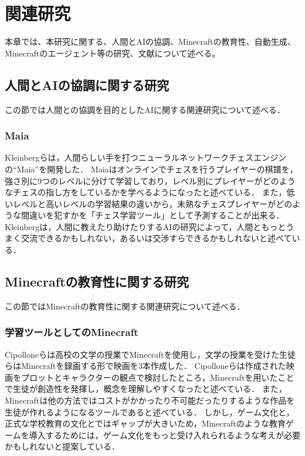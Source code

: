 \chapter{関連研究}	
\thispagestyle{plain}   %

本章では、本研究に関する、人間とAIの協調、Minecraftの教育性、自動生成、Minecraftのエージェント等の研究、文献について述べる。

\section{人間とAIの協調に関する研究}
この節では人間との協調を目的としたAIに関する関連研究について述べる．

\subsection{Maia}
Kleinbergらは，人間らしい手を打つニューラルネットワークチェスエンジンの“Maia”を開発した\cite{bib:maia}．
Maiaはオンラインでチェスを行うプレイヤーの棋譜を，強さ別に9つのレベルに分けて学習しており，レベル別にプレイヤーがどのようなチェスの指し方をしているかを学べるようになったと述べている．
また，低いレベルと高いレベルの学習結果の違いから，未熟なチェスプレイヤーがどのような間違いを犯すかを「チェス学習ツール」として予測することが出来る．
Kleinbergは，人間に教えたり助けたりするAIの研究によって，人間ともっとうまく交流できるかもしれない，あるいは交渉すらできるかもしれないと述べている．


\section{Minecraftの教育性に関する研究}
この節ではMinecraftの教育性に関する関連研究について述べる．

\subsection{学習ツールとしてのMinecraft}
Cipolloneらは高校の文学の授業でMinecraftを使用し，文学の授業を受けた生徒らはMinecraftを録画する形で映画を3本作成した\cite{bib:minecraft_creative tool}．
Cipolloneらは作成された映画をプロットとキャラクターの観点で検討したところ，Minecraftを用いたことで生徒が創造性を発揮し，概念を理解しやすくなったと述べている．
また，Minecraftは他の方法ではコストがかかったり不可能だったりするような作品を生徒が作れるようになるツールであると述べている．
しかし，ゲーム文化と，正式な学校教育の文化とではギャップが大きいため，Minecraftのような教育ゲームを導入するためには，ゲーム文化をもっと受け入れられるような考えが必要かもしれないと提案している．


